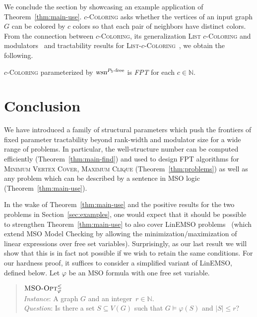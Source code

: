 \documentclass{llncs}
\newcommand{\Nat}{\mathbb{N}}
\newcommand{\Card}[1]{|#1|}
\newcommand{\MSOOPT}[2]{\textsc{MSO-Opt${}^{#1}_{#2}$}}
\newcommand{\wsn}{\text{\normalfont\slshape wsn}}
\begin{document}
We conclude the section by showcasing an example application of Theorem~\ref{thm:main-use}.  \textsc{$c$-Coloring} asks whether the vertices of an input graph $G$ can be colored by $c$ colors so that each pair of neighbors have distinct colors. From the connection between \textsc{$c$-Coloring}, its generalization \textsc{List $c$-Coloring} and modulators~\cite[Theorem 3.3]{Cai03} and tractability results for \textsc{List-$c$-Coloring}~\cite[Page 5]{GolovachPaulusmaSong14}, we obtain the following.

\begin{corollary}
\label{cor:coloring}
\textsc{$c$-Coloring} parameterized by $\wsn^{P_5\text{-free}}$ is \emph{FPT} for each $c\in \Nat$.
\end{corollary}


\section{Conclusion}
\label{sec:hardness}

We have introduced a family of structural parameters which push the frontiers of fixed parameter tractability beyond rank-width and modulator size for a wide range of problems. In particular, the well-structure number can be computed efficiently (Theorem~\ref{thm:main-find}) and used to design FPT algorithms for \textsc{Minimum Vertex Cover}, \textsc{Maximum Clique} (Theorem~\ref{thm:problems}) as well as any problem which can be described by a sentence in MSO logic (Theorem~\ref{thm:main-use}).

In the wake of Theorem~\ref{thm:main-use} and the positive results for
the two problems in Section~\ref{sec:examples}, one would expect that
it should be possible to strengthen Theorem~\ref{thm:main-use} to also
cover LinEMSO
problems~\cite{CourcelleMakowskyRotics00,GanianHlineny10} (which
extend MSO Model Checking by allowing the minimization/maximization of
linear expressions over free set variables). Surprisingly, as our last
result we will show that this is in fact not possible if we wish to retain
the same conditions. For our hardness proof, it suffices to consider
a simplified variant of LinEMSO, defined below. Let $\varphi$ be an
MSO formula with one free set variable.
\begin{quote}
  $\MSOOPT{\leq}{\varphi}$\\
  \nopagebreak \emph{Instance}: A graph $G$ and an integer~$r\in
  \Nat$. \\ \nopagebreak \nopagebreak \emph{Question}: Is there a set
  $S \subseteq V(G)$ such that $G \models \varphi(S)$ and $\Card{S} \leq
  r$?
\end{quote}
\end{document}
